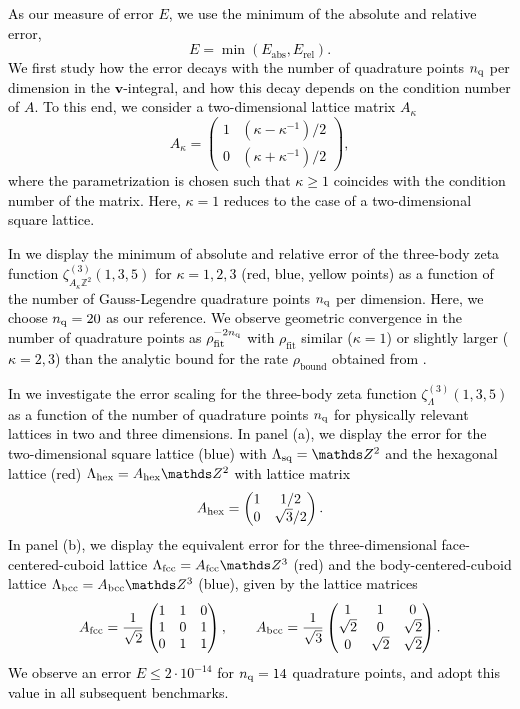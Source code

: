 \documentclass[]{amsart}
\numberwithin{mythm}{section}
\newcommand{\new}[1]{{\textcolor{black}{#1}}}
\begin{document}
\new{
As our measure of error $E$, we use the minimum of the absolute and relative error,
\[
E=\min(E_\mathrm{abs},E_\mathrm{rel}).
\]
We first study how the error decays with the number of quadrature points $n_{\rm q}$ per dimension in the $\bm v$-integral, and how this decay depends on the condition number of $A$. To this end, we consider a two-dimensional lattice matrix $A_\kappa$ 
\begin{equation}
\label{eq:A_kappa}
A_{\kappa}=
\begin{pmatrix}
1 & (\kappa - \kappa^{-1})/2 \\
0 & (\kappa+ \kappa^{-1})/2
\end{pmatrix},
\end{equation}
where the parametrization is chosen such that $\kappa \ge 1$ coincides with the condition number of the matrix. Here, $\kappa = 1$ reduces to the case of a two-dimensional square lattice. 
}


\new{
In  we display the minimum of absolute and relative error of the three-body zeta function 
$\zeta^{(3)}_{A_\kappa \mathds Z^2}(1,3,5)$ for $\kappa = 1,2,3$ (red, blue, yellow points)
as a function of the number of Gauss-Legendre quadrature points $n_{\rm q}$ per dimension. Here, we choose  $n_{\rm q}=20$ as our reference.
We observe geometric convergence   in the number of quadrature points as $\rho_\mathrm{fit}^{-2n_{\rm q}}$ with $\rho_\mathrm{fit}$ similar ($\kappa=1$) or slightly larger ($\kappa=2,3$) than the analytic bound for the rate $\rho_\mathrm{bound}$ obtained from \Cref{hol-bernstein}.
}

\new{
In 
we investigate the error scaling for the three-body zeta function $\zeta^{(3)}_{\Lambda}(1,3,5)$ as a function of the number of quadrature points $n_{\rm q}$ for physically relevant lattices in two and three dimensions. In panel (a), we display the error for the two-dimensional  
 square lattice (blue) with 
$\Lambda_{\rm sq}=\mathds Z^2$ and
the hexagonal lattice (red)
$\Lambda_{\rm hex}=A_{\rm hex}\mathds Z^2$
with lattice matrix
$$
A_{\rm hex}=
\begin{pmatrix}
    1&  1/2 \\ 0 & \sqrt3/2
\end{pmatrix}.
$$
In panel (b), we display the equivalent error for the three-dimensional face-centered-cuboid lattice $\Lambda_{\rm fcc}=A_{\rm fcc}\mathds Z^3$ (red)
and the  body-centered-cuboid lattice $\Lambda_{\rm bcc}=A_{\rm bcc}\mathds Z^3$ (blue), given by the lattice matrices \cite{roblesnavarro2025exact}
$$
A_{\rm fcc}=
\frac{1}{\sqrt{2}}
\begin{pmatrix}
1 & 1 & 0 \\ 
1 & 0 & 1 \\ 
0 & 1 & 1
\end{pmatrix}
,\qquad
A_{\rm bcc}=
\frac{1}{\sqrt{3}}
\begin{pmatrix}
1 & 1 & 0 \\ 
\sqrt{2} & 0 & \sqrt{2} \\ 
0 & \sqrt{2} &\sqrt{2}
\end{pmatrix}.
$$
We observe an error $E\le 2\cdot 10^{-14}$ for $n_{\rm q}=14$ quadrature points, and adopt this value in all subsequent benchmarks.
}
\end{document}
